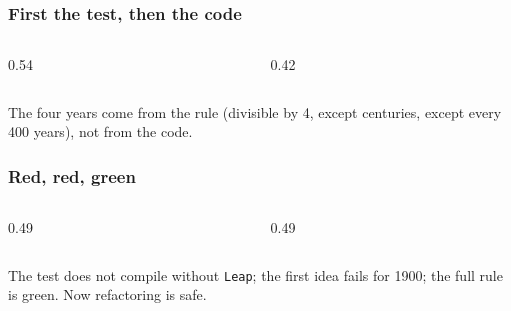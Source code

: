 \documentclass[aspectratio=169,10pt,compress]{beamer}
\begin{document}




\begin{frame}[t,fragile] \frametitle{First the test, then the code}
  \begin{columns}[T]
    \begin{column}{0.54\textwidth}
    \end{column}
    \begin{column}{0.42\textwidth}
    \end{column}
  \end{columns}
  \small The four years come from the rule (divisible by 4, except centuries, except every 400 years), not from the code.
\end{frame}




\begin{frame}[t,fragile] \frametitle{Red, red, green}
  \begin{columns}[T]
    \begin{column}{0.49\textwidth}
    \end{column}
    \begin{column}{0.49\textwidth}
    \end{column}
  \end{columns}

  \vspace{0.1em}
  \small
  The test does not compile without \texttt{Leap}; the first idea fails for 1900; the full rule is green. Now refactoring is safe.
\end{frame}

\end{document}

